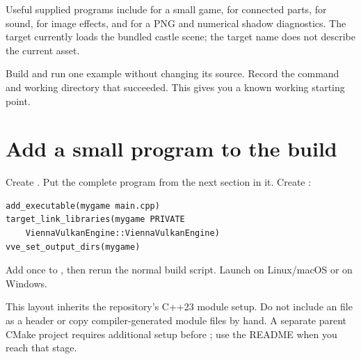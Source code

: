 \documentclass[11pt,a4paper]{article}
\begin{document}
Useful supplied programs include  for a small game,  for connected parts,  for sound,  for image effects, and  for a PNG and numerical shadow diagnostics. The  target currently loads the bundled castle scene; the target name does not describe the current asset.

\begin{tryit}Build and run one example without changing its source. Record the command and working directory that succeeded. This gives you a known working starting point.\end{tryit}

\section{Add a small program to the build}
Create . Put the complete program from the next section in it. Create :
\begin{lstlisting}[language={}]
add_executable(mygame main.cpp)
target_link_libraries(mygame PRIVATE
    ViennaVulkanEngine::ViennaVulkanEngine)
vve_set_output_dirs(mygame)
\end{lstlisting}
Add  once to , then rerun the normal build script. Launch  on Linux/macOS or  on Windows.

This layout inherits the repository's C++23 module setup. Do not include an  file as a header or copy compiler-generated module files by hand. A separate parent CMake project requires additional  setup before ; use the README when you reach that stage.
\end{document}
